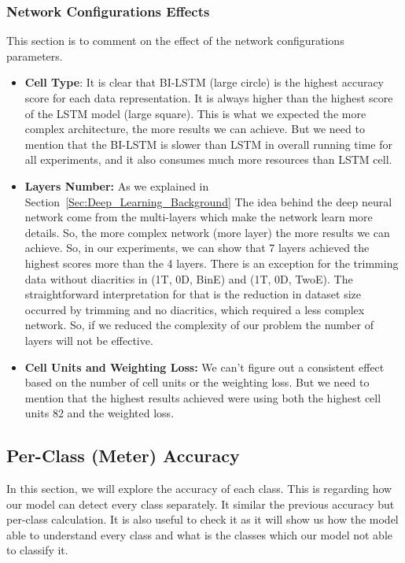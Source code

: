   
\subsubsection{Network Configurations Effects} 

This section is to comment on the effect of the network configurations parameters.
\begin{itemize}
\item \textbf{Cell Type}: It is clear that BI-LSTM  (large circle) is the highest accuracy score for each data representation. It is always higher than the highest score of the LSTM model (large square). This is what we expected the more complex architecture, the more results we can achieve. But we need to mention that the BI-LSTM is slower than LSTM in overall running time for all experiments, and it also consumes much more resources than LSTM cell.
\item \textbf{Layers Number:} As we explained in Section~\ref{Sec:Deep_Learning_Background} The idea behind the deep neural network come from the multi-layers which make the network learn more details. So, the more complex network (more layer) the more results we can achieve. So, in our experiments, we can show that 7 layers achieved the highest scores more than the 4 layers. There is an exception for the trimming data without diacritics in (1T, 0D, BinE) and (1T, 0D, TwoE). The straightforward interpretation for that is the reduction in dataset size occurred by trimming and no diacritics, which required a less complex network. So, if we reduced the complexity of our problem the number of layers will not be effective.

\item \textbf{Cell Units and Weighting Loss:} We can't figure out a consistent effect based on the number of cell units or the weighting loss. But we need to mention that the highest results achieved were using both the highest cell units 82 and the weighted loss.
  \end{itemize}



\subsection{Per-Class (Meter) Accuracy}

In this section, we will explore the accuracy of each class. This is regarding how our model can detect every class separately. It similar the previous accuracy but per-class calculation. It is also useful to check it as it will show us how the model able to understand every class and what is the classes which our model not able to classify it. 

